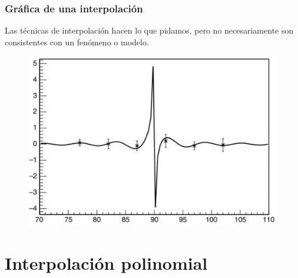 \begin{frame}
\frametitle{Gráfica de una interpolación}
Las técnicas de interpolación hacen lo que pidamos, pero no necesariamente son consistentes con un fenómeno o modelo.
\begin{figure}
	\centering
		\includegraphics[scale=0.4]{Imagenes/figura02.eps} 
\end{figure}
\end{frame}
\section{Interpolación polinomial}
